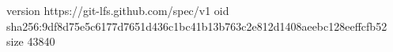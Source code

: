 version https://git-lfs.github.com/spec/v1
oid sha256:9df8d75e5c6177d7651d436c1bc41b13b763c2e812d1408aeebc128eeffcfb52
size 43840
